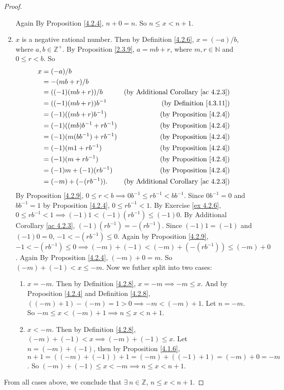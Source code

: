 \begin{proof}
\begin{enumerate}
    Again By Proposition \ref{4.2.4}, \(n + 0 = n\).
    So \(n \leq x < n + 1\).
    \item \(x\) is a negative rational number.
    Then by Definition \ref{4.2.6}, \(x = (-a) / b\), where \(a, b \in \mathds{Z}^+\).
    By Proposition \ref{2.3.9}, \(a = mb + r\), where \(m, r \in \mathds{N}\) and \(0 \leq r < b\).
    So
    \begin{align*}
    x &= (-a) / b \\
    &= -(mb + r) / b \\
    &= ((-1)(mb + r)) / b & \text{(by Additional Corollary \ref{ac 4.2.3})} \\
    &= ((-1)(mb + r))b^{-1} & \text{(by Definition \ref{4.3.11})} \\
    &= (-1)((mb + r)b^{-1}) & \text{(by Proposition \ref{4.2.4})} \\
    &= (-1)((mb)b^{-1} + rb^{-1}) & \text{(by Proposition \ref{4.2.4})} \\
    &= (-1)(m(bb^{-1}) + rb^{-1}) & \text{(by Proposition \ref{4.2.4})} \\
    &= (-1)(m1 + rb^{-1}) & \text{(by Proposition \ref{4.2.4})} \\
    &= (-1)(m + rb^{-1}) & \text{(by Proposition \ref{4.2.4})} \\
    &= (-1)m + (-1)(rb^{-1}) & \text{(by Proposition \ref{4.2.4})} \\
    &= (-m) + (-(rb^{-1})). & \text{(by Additional Corollary \ref{ac 4.2.3})} \\
    \end{align*}
    By Proposition \ref{4.2.9}, \(0 \leq r < b \implies 0b^{-1} \leq rb^{-1} < bb^{-1}\).
    Since \(0b^{-1} = 0\) and \(bb^{-1} = 1\) by Proposition \ref{4.2.4}, \(0 \leq rb^{-1} < 1\).
    By Exercise \ref{ex 4.2.6}, \(0 \leq rb^{-1} < 1 \implies (-1)1 < (-1)(rb^{-1}) \leq (-1)0\).
    By Additional Corollary \ref{ac 4.2.3}, \((-1)(rb^{-1}) = -(rb^{-1})\).
    Since \((-1)1 = (-1)\) and \((-1)0 = 0\), \(-1 < -(rb^{-1}) \leq 0\).
    Again by Proposition \ref{4.2.9}, \(-1 < -(rb^{-1}) \leq 0 \implies (-m) + (-1) < (-m) + (-(rb^{-1})) \leq (-m) + 0\).
    Again By Proposition \ref{4.2.4}, \((-m) + 0 = m\).
    So \((-m) + (-1) < x \leq -m\).
    Now we futher split into two cases:
    \begin{enumerate}[label=(\roman*)]
        \item \(x = -m\).
        Then by Definition \ref{4.2.8}, \(x = -m \implies -m \leq x\).
        And by Proposition \ref{4.2.4} and Definition \ref{4.2.8}, \(((-m) + 1) - (-m) = 1 > 0 \implies -m < (-m) + 1\).
        Let \(n = -m\).
        So \(-m \leq x < (-m) + 1 \implies n \leq x < n + 1\).
        \item \(x < -m\).
        Then by Definition \ref{4.2.8}, \((-m) + (-1) < x \implies (-m) + (-1) \leq x\).
        Let \(n = (-m) + (-1)\), then by Proposition \ref{4.1.6}, \(n + 1 = ((-m) + (-1)) + 1 = (-m) + ((-1) + 1) = (-m) + 0 = -m\).
        So \((-m) + (-1) \leq x < -m \implies n \leq x < n + 1\).
    \end{enumerate}
\end{enumerate}
From all cases above, we conclude that \(\exists\ n \in \mathds{Z}\), \(n \leq x < n + 1\).


\end{proof}
